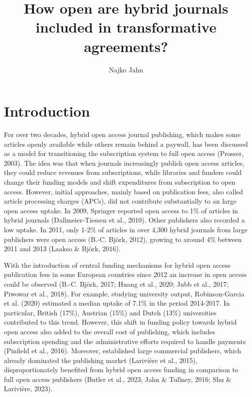 \documentclass[a4paper,man,floatsintext,longtable,noextraspace,12pt]{apa6}
\title{\textbf{How open are hybrid journals included in transformative agreements?}}
\author{Najko Jahn}
\affiliation{Göttingen State and University Library, University of Göttingen\\
Platz der Göttinger Sieben 1, 37073 Göttingen, Germany\\
najko.jahn@sub.uni-goettingen.de
}
\begin{document}
\maketitle


\hypertarget{introduction}{%
\section{Introduction}\label{introduction}}

For over two decades, hybrid open access journal publishing, which makes
some articles openly available while others remain behind a paywall, has
been discussed as a model for transitioning the subscription system to
full open access (Prosser, 2003). The idea was that when journals
increasingly publish open access articles, they could reduce revenues
from subscriptions, while libraries and funders could change their
funding models and shift expenditures from subscription to open access.
However, initial approaches, mainly based on publication fees, also
called article processing charges (APCs), did not contribute
substantially to an large open access uptake. In 2009, Springer reported
open access to 1\% of articles in hybrid journals (Dallmeier-Tiessen et
al., 2010). Other publishers also recorded a low uptake. In 2011, only
1-2\% of articles in over 4,300 hybrid journals from large publishers
were open access (B.-C. Björk, 2012), growing to around 4\% between 2011
and 2013 (Laakso \& Björk, 2016).

With the introduction of central funding mechanisms for hybrid open
access publication fees in some European countries since 2012 an
increase in open access could be observed (B.-C. Björk, 2017; Huang et
al., 2020; Jubb et al., 2017; Piwowar et al., 2018). For example,
studying university output, Robinson-Garcia et al. (2020) estimated a
median uptake of 7.1\% in the period 2014-2017. In particular, British
(17\%), Austrian (15\%) and Dutch (13\%) universities contributed to
this trend. However, this shift in funding policy towards hybrid open
access also added to the overall cost of publishing, which includes
subscription spending and the administrative efforts required to handle
payments (Pinfield et al., 2016). Moreover, established large commercial
publishers, which already dominated the publishing market (Larivière et
al., 2015), disproportionately benefited from hybrid open access funding
in comparison to full open access publishers (Butler et al., 2023; Jahn
\& Tullney, 2016; Shu \& Larivière, 2023).
\end{document}
